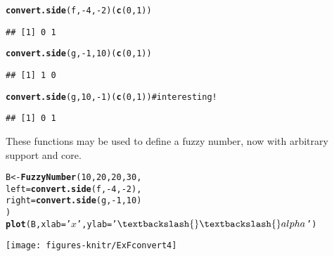 \documentclass[11pt]{article}\usepackage{graphicx, color}
\makeatletter
\newcommand{\hlfunctioncall}[1]{\textcolor[rgb]{0.501960784313725,0,0.329411764705882}{\textbf{#1}}}%
\newcommand{\hlstring}[1]{\textcolor[rgb]{0.6,0.6,1}{#1}}%
\newcommand{\hlcomment}[1]{\textcolor[rgb]{0.180392156862745,0.6,0.341176470588235}{#1}}%
\newenvironment{kframe}{%
 \def\at@end@of@kframe{}%
 \ifinner\ifhmode%
  \def\at@end@of@kframe{\end{minipage}}%
  \begin{minipage}{\columnwidth}%
 \fi\fi%
 \def\FrameCommand##1{\hskip\@totalleftmargin \hskip-\fboxsep
 \colorbox{shadecolor}{##1}\hskip-\fboxsep
     \hskip-\linewidth \hskip-\@totalleftmargin \hskip\columnwidth}%
 \MakeFramed {\advance\hsize-\width
   \@totalleftmargin\z@ \linewidth\hsize
   \@setminipage}}%
 {\par\unskip\endMakeFramed%
 \at@end@of@kframe}
\newenvironment{knitrout}{}{} %
\makeatother
\begin{document}
\begin{knitrout}\small
{}\color{fgcolor}\begin{kframe}
\begin{alltt}
\hlfunctioncall{convert.side}(f, -4, -2)(\hlfunctioncall{c}(0,1))
\end{alltt}
\begin{verbatim}
## [1] 0 1
\end{verbatim}
\begin{alltt}
\hlfunctioncall{convert.side}(g, -1, 10)(\hlfunctioncall{c}(0,1))
\end{alltt}
\begin{verbatim}
## [1] 1 0
\end{verbatim}
\begin{alltt}
\hlfunctioncall{convert.side}(g, 10, -1)(\hlfunctioncall{c}(0,1)) \hlcomment{# interesting!}
\end{alltt}
\begin{verbatim}
## [1] 0 1
\end{verbatim}
\end{kframe}
\end{knitrout}


\noindent
These functions may be used to define a fuzzy number,
now with arbitrary support and core.

\begin{knitrout}\small
{}\color{fgcolor}\begin{kframe}
\begin{alltt}
B <- \hlfunctioncall{FuzzyNumber}(10,20,20,30,
    left=\hlfunctioncall{convert.side}(f, -4, -2),
   right=\hlfunctioncall{convert.side}(g, -1, 10)
)
\hlfunctioncall{plot}(B, xlab=\hlstring{'$x$'}, ylab=\hlstring{'$\textbackslash{}\textbackslash{}alpha$'})
\end{alltt}
\end{kframe}
\end{knitrout}


\begin{center}
\begin{knitrout}\small
{}\color{fgcolor}

{\centering \texttt{[image: figures-knitr/ExFconvert4]} 

}



\end{knitrout}

\end{center}
\end{document}
